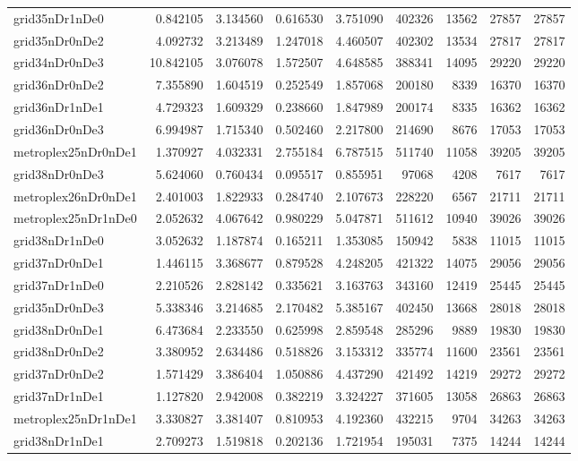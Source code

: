\begin{longtable}{|l|r|r|r|r|r|r|r|r|}
grid35nDr1nDe0 & 0.842105 & 3.134560 & 0.616530 & 3.751090 & 402326 & 13562 & 27857 & 27857 \\
grid35nDr0nDe2 & 4.092732 & 3.213489 & 1.247018 & 4.460507 & 402302 & 13534 & 27817 & 27817 \\
grid34nDr0nDe3 & 10.842105 & 3.076078 & 1.572507 & 4.648585 & 388341 & 14095 & 29220 & 29220 \\
grid36nDr0nDe2 & 7.355890 & 1.604519 & 0.252549 & 1.857068 & 200180 & 8339 & 16370 & 16370 \\
grid36nDr1nDe1 & 4.729323 & 1.609329 & 0.238660 & 1.847989 & 200174 & 8335 & 16362 & 16362 \\
grid36nDr0nDe3 & 6.994987 & 1.715340 & 0.502460 & 2.217800 & 214690 & 8676 & 17053 & 17053 \\
metroplex25nDr0nDe1 & 1.370927 & 4.032331 & 2.755184 & 6.787515 & 511740 & 11058 & 39205 & 39205 \\
grid38nDr0nDe3 & 5.624060 & 0.760434 & 0.095517 & 0.855951 & 97068 & 4208 & 7617 & 7617 \\
metroplex26nDr0nDe1 & 2.401003 & 1.822933 & 0.284740 & 2.107673 & 228220 & 6567 & 21711 & 21711 \\
metroplex25nDr1nDe0 & 2.052632 & 4.067642 & 0.980229 & 5.047871 & 511612 & 10940 & 39026 & 39026 \\
grid38nDr1nDe0 & 3.052632 & 1.187874 & 0.165211 & 1.353085 & 150942 & 5838 & 11015 & 11015 \\
grid37nDr0nDe1 & 1.446115 & 3.368677 & 0.879528 & 4.248205 & 421322 & 14075 & 29056 & 29056 \\
grid37nDr1nDe0 & 2.210526 & 2.828142 & 0.335621 & 3.163763 & 343160 & 12419 & 25445 & 25445 \\
grid35nDr0nDe3 & 5.338346 & 3.214685 & 2.170482 & 5.385167 & 402450 & 13668 & 28018 & 28018 \\
grid38nDr0nDe1 & 6.473684 & 2.233550 & 0.625998 & 2.859548 & 285296 & 9889 & 19830 & 19830 \\
grid38nDr0nDe2 & 3.380952 & 2.634486 & 0.518826 & 3.153312 & 335774 & 11600 & 23561 & 23561 \\
grid37nDr0nDe2 & 1.571429 & 3.386404 & 1.050886 & 4.437290 & 421492 & 14219 & 29272 & 29272 \\
grid37nDr1nDe1 & 1.127820 & 2.942008 & 0.382219 & 3.324227 & 371605 & 13058 & 26863 & 26863 \\
metroplex25nDr1nDe1 & 3.330827 & 3.381407 & 0.810953 & 4.192360 & 432215 & 9704 & 34263 & 34263 \\
grid38nDr1nDe1 & 2.709273 & 1.519818 & 0.202136 & 1.721954 & 195031 & 7375 & 14244 & 14244 \\

\end{longtable}

